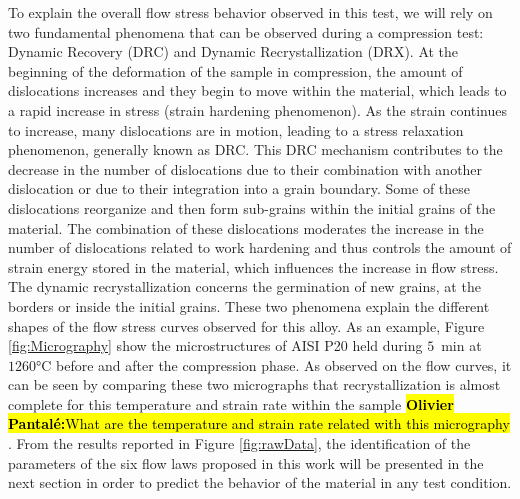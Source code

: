 \documentclass[twoside,english,1p,final,sort&compress]{elsarticle}
\theoremstyle{plain}
\DeclareRobustCommand{\OP}[1]{ {\begingroup\sethlcolor{VWyellow}\textcolor{red}{\hl{\textbf{Olivier Pantal\'e:}#1}}\endgroup} }
\begin{document}
To explain the overall flow stress behavior observed in this test, we will rely on two fundamental phenomena that can be observed during a compression test: Dynamic Recovery (DRC) and Dynamic Recrystallization (DRX). At the beginning of the deformation of the sample in compression, the amount of dislocations increases and they begin to move within the material, which leads to a rapid increase in stress (strain hardening phenomenon). As the strain continues to increase, many dislocations are in motion, leading to a stress relaxation phenomenon, generally known as DRC. This DRC mechanism contributes to the decrease in the number of dislocations due to their combination with another dislocation or due to their integration into a grain boundary. Some of these dislocations reorganize and then form sub-grains within the initial grains of the material. The combination of these dislocations moderates the increase in the number of dislocations related to work hardening and thus controls the amount of strain energy stored in the material, which influences the increase in flow stress. The dynamic recrystallization concerns the germination of new grains, at the borders or inside the initial grains. These two phenomena explain the different shapes of the flow stress curves observed for this alloy. As an example, Figure \ref{fig:Micrography} show the microstructures of AISI P20 held during $5$~min at $1260$°C before and after the compression phase. As observed on the flow curves, it can be seen by comparing these two micrographs that recrystallization is almost complete for this temperature and strain rate within the sample \OP{What are the temperature and strain rate related with this micrography}. From the results reported in Figure \ref{fig:rawData}, the identification of the parameters of the six flow laws proposed in this work will be presented in the next section in order to predict the behavior of the material in any test condition.
\end{document}
